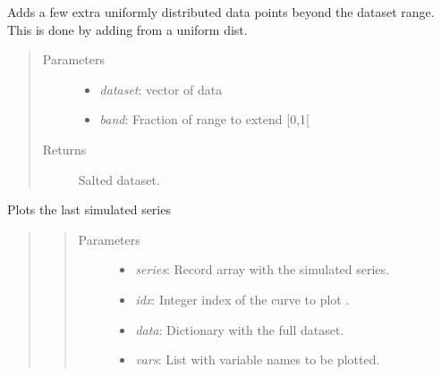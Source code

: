 \documentclass[a4paper,10pt,english]{sphinxmanual}
\begin{document}
\begin{fulllineitems}

\begin{fulllineitems}
\label{BIP.Bayes:BIP.Bayes.Melding.Meld.add_salt}
Adds a few extra uniformly distributed data 
points beyond the dataset range.
This is done by adding from a uniform dist.
\begin{quote}\begin{description}
\item[{Parameters}] \leavevmode\begin{itemize}
\item {} 
\emph{dataset}: vector of data

\item {} 
\emph{band}: Fraction of range to extend {[}0,1{[}

\end{itemize}

\item[{Returns}] \leavevmode
Salted dataset.

\end{description}\end{quote}

\end{fulllineitems}


\begin{fulllineitems}
\label{BIP.Bayes:BIP.Bayes.Melding.Meld.current_plot}
Plots the last simulated series
\begin{quote}
\begin{quote}\begin{description}
\item[{Parameters}] \leavevmode\begin{itemize}
\item {} 
\emph{series}: Record array with the simulated series.

\item {} 
\emph{idx}: Integer index of the curve to plot .

\item {} 
\emph{data}: Dictionary with the full dataset.

\item {} 
\emph{vars}: List with variable names to be plotted.


\end{itemize}
\end{description}
\end{quote}
\end{quote}
\end{fulllineitems}
\end{fulllineitems}
\end{document}
